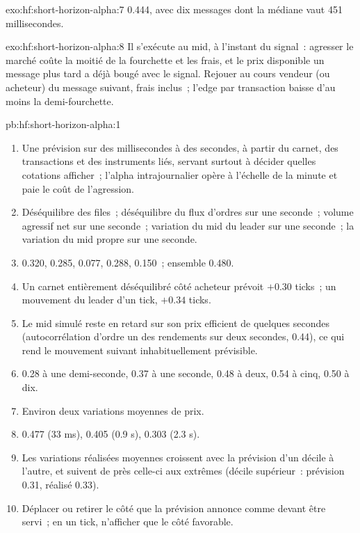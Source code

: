 \begin{solution}{exo:hf:short-horizon-alpha:7}
0.444, avec dix messages dont la médiane vaut 451 millisecondes.
\end{solution}

\begin{solution}{exo:hf:short-horizon-alpha:8}
Il s'exécute au mid, à l'instant du signal~: agresser le marché coûte la moitié de la fourchette et les frais, et le prix disponible un message plus tard a déjà
bougé avec le signal. Rejouer au cours vendeur (ou acheteur) du message suivant, frais inclus~; l'edge par transaction baisse d'au moins la demi-fourchette.
\end{solution}

\begin{solution}{pb:hf:short-horizon-alpha:1}
\begin{enumerate}
\item Une prévision sur des millisecondes à des secondes, à partir du carnet, des transactions et des instruments liés, servant surtout à décider quelles cotations afficher~; l'alpha intrajournalier
opère à l'échelle de la minute et paie le coût de l'agression.
\item Déséquilibre des files~; déséquilibre du flux d'ordres sur une seconde~; volume agressif net sur une seconde~; variation du mid du leader sur une seconde~; la
variation du mid propre sur une seconde.
\item 0.320, 0.285, 0.077, 0.288, 0.150~; ensemble 0.480.
\item Un carnet entièrement déséquilibré côté acheteur prévoit $+0.30$ ticks~; un mouvement du leader d'un tick, $+0.34$ ticks.
\item Le mid simulé reste en retard sur son prix efficient de quelques secondes (autocorrélation d'ordre un des rendements sur deux secondes, 0.44), ce qui rend le mouvement suivant inhabituellement
prévisible.
\item 0.28 à une demi-seconde, 0.37 à une seconde, 0.48 à deux, 0.54 à cinq, 0.50 à dix.
\item Environ deux variations moyennes de prix.
\item 0.477 (33 ms), 0.405 (0.9 s), 0.303 (2.3 s).
\item Les variations réalisées moyennes croissent avec la prévision d'un décile à l'autre, et suivent de près celle-ci aux extrêmes (décile supérieur~: prévision 0.31, réalisé 0.33).
\item Déplacer ou retirer le côté que la prévision annonce comme devant être servi~; en un tick, n'afficher que le côté favorable.

\end{enumerate}
\end{solution}
